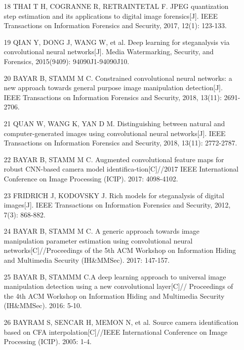 \documentclass{article}
\begin{document}
\begin{itemize}
\item 
[18] THAI T H, COGRANNE R, RETRAINTETAL F. JPEG quantization step estimation and its applications to digital image forensics[J]. IEEE Transactions on Information Forensics and Security, 2017, 12(1): 123-133.

\item 
[19] QIAN Y, DONG J, WANG W, et al. Deep learning for steganalysis via convolutional neural networks[J]. Media Watermarking, Security, and Forensics, 2015(9409): 94090J1-94090J10.

\item 
[20] BAYAR B, STAMM M C. Constrained convolutional neural networks: a new approach towards general purpose image manipulation detection[J]. IEEE Transactions on Information Forensics and Security, 2018, 13(11): 2691-2706.

\item 
[21] QUAN W, WANG K, YAN D M. Distinguishing between natural and computer-generated images using convolutional neural networks[J]. IEEE Transactions on Information Forensics and Security, 2018, 13(11): 2772-2787.

\item 
[22] BAYAR B, STAMM M C. Augmented convolutional feature maps for robust CNN-based camera model identifica-tion[C]//2017 IEEE International Conference on Image Processing (ICIP). 2017: 4098-4102.

\item 
[23] FRIDRICH J, KODOVSKY J. Rich models for steganalysis of digital images[J]. IEEE Transactions on Information Forensics and Security, 2012, 7(3): 868-882.

\item 
[24] BAYAR B, STAMM M C. A generic approach towards image manipulation parameter estimation using convolutional neural networks[C]//Proceedings of the 5th ACM Workshop on Information Hiding and Multimedia Security (IH\&MMSec). 2017: 147-157.

\item 
[25] BAYAR B, STAMMM C.A deep learning approach to universal image manipulation detection using a new convolutional layer[C]// Proceedings of the 4th ACM Workshop on Information Hiding and Multimedia Security (IH\&MMSec). 2016: 5-10.

\item 
[26] BAYRAM S, SENCAR H, MEMON N, et al. Source camera identification based on CFA interpolation[C]//IEEE International Conference on Image Processing (ICIP). 2005: 1-4.


\end{itemize}
\end{document}

